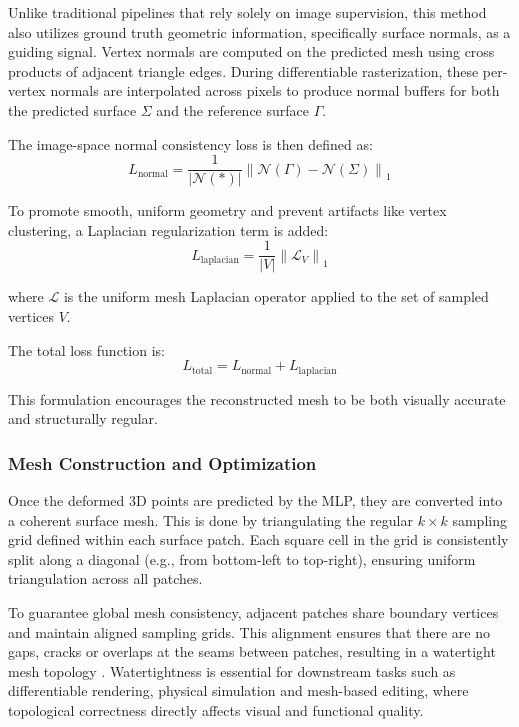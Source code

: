 Unlike traditional pipelines that rely solely on image supervision, this method also utilizes ground truth geometric information, specifically surface normals, as a guiding signal.
Vertex normals are computed on the predicted mesh using cross products of adjacent triangle edges.
During differentiable rasterization, these per-vertex normals are interpolated across pixels to produce normal buffers for both the predicted surface $\Sigma$ and the reference surface $\Gamma$.

The image-space normal consistency loss is then defined as:
\[
L_{\text{normal}} = \frac{1}{|\mathcal{N}(*)|} \left\| \mathcal{N}(\Gamma) - \mathcal{N}(\Sigma) \right\|_1
\]

To promote smooth, uniform geometry and prevent artifacts like vertex clustering, a Laplacian regularization term is added:
\[
L_{\text{laplacian}} = \frac{1}{|V|} \left\| \mathcal{L}_V \right\|_1
\]

where $\mathcal{L}$ is the uniform mesh Laplacian operator applied to the set of sampled vertices $V$.

The total loss function is:
\[
L_{\text{total}} = L_{\text{normal}} + L_{\text{laplacian}}
\]

This formulation encourages the reconstructed mesh to be both visually accurate and structurally regular.

\subsubsection{Mesh Construction and Optimization}

Once the deformed 3D points are predicted by the MLP, they are converted into a coherent surface mesh.
This is done by triangulating the regular $k \times k$ sampling grid defined within each surface patch.
Each square cell in the grid is consistently split along a diagonal (e.g., from bottom-left to top-right), ensuring uniform triangulation across all patches.

To guarantee global mesh consistency, adjacent patches share boundary vertices and maintain aligned sampling grids.
This alignment ensures that there are no gaps, cracks or overlaps at the seams between patches, resulting in a watertight mesh topology \cite{sivaram2024}.
Watertightness is essential for downstream tasks such as differentiable rendering, physical simulation and mesh-based editing, where topological correctness directly affects visual and functional quality.

